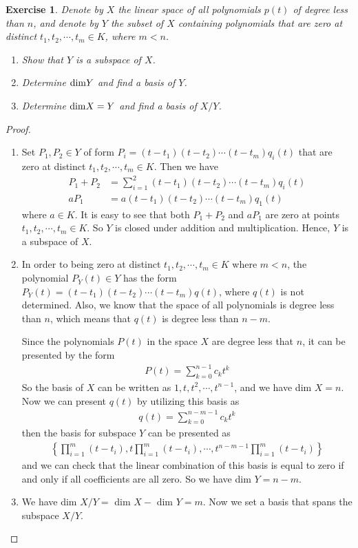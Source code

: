 \documentclass[10pt]{book}
\newtheorem{exercise}{Exercise}[section]
\theoremstyle{definition}
\numberwithin{equation}{chapter}
\begin{document}
\medskip

\begin{exercise}\label{ex_4}
Denote by $X$ the linear space of all polynomials $p(t)$ of degree less than $n$, and denote by $Y$ the subset of $X$ containing polynomials that are zero at distinct $t_1,t_2,\cdots,t_m\in K$, where $m < n$.
\begin{enumerate}[label=(\alph*)]
    \item Show that $Y$ is a subspace of $X$.
    \item Determine ${\rm dim}Y$ and find a basis of $Y$.
    \item Determine ${\rm dim}X = Y$ and find a basis of $X/Y$.
\end{enumerate}
\end{exercise}
\begin{proof}
~\begin{enumerate}[label=(\alph*)]
    \item Set $P_1, P_2 \in Y$ of form $P_i = (t-t_1)(t-t_2) \cdots (t-t_m)q_i(t)$ that are zero at distinct $t_1, t_2, \cdots, t_m\in K$. Then we have 
    \begin{align*}
        P_1 + P_2 &= \sum^2_{i=1}(t-t_1)(t-t_2) \cdots (t-t_m)q_i(t) \\
        a P_1 &= a (t-t_1)(t-t_2) \cdots (t-t_m)q_1(t)
    \end{align*}
    where $a \in K$. It is easy to see that both $P_1 + P_2$ and $a P_1$ are zero at points $t_1, t_2, \cdots, t_m\in K$. So $Y$ is closed under addition and multiplication. Hence, $Y$ is a subspace of $X$.
    \item In order to being zero at distinct $t_1, t_2, \cdots, t_m\in K$ where $m < n$, the polynomial $P_Y(t) \in Y$ has the form $P_Y(t) = (t-t_1)(t-t_2) \cdots (t-t_m)q(t)$, where $q(t)$ is not determined. Also, we know that the space of all polynomials is degree less than $n$, which means that $q(t)$ is degree less than $n-m$.
    
    Since the polynomials $P(t)$ in the space $X$ are degree less that $n$, it can be presented by the form
    \begin{align*}
        P(t) = \sum^{n-1}_{k=0} c_k t^k
    \end{align*}
    So the basis of $X$ can be written as ${1, t, t^2,\cdots, t^{n-1}}$, and we have dim $X = n$. Now we can present $q(t)$ by utilizing this basis as 
    \begin{align*}
        q(t) = \sum^{n-m-1}_{k=0} c_k t^k
    \end{align*}
    then the basis for subspace $Y$ can be presented as
    \begin{align*}
        \left\{ \prod^m_{i=1}(t-t_i), t\prod^m_{i=1}(t-t_i),\cdots, t^{n-m-1}\prod^m_{i=1}(t-t_i) \right\}
    \end{align*}
    and we can check that the linear combination of this basis is equal to zero if and only if all coefficients are all zero. So we have dim $Y = n-m$.
    \item We have dim $X/Y =$ dim $X -$ dim $Y = m$. Now we set a basis that spans the subspace $X/Y$.
    

\end{enumerate}
\end{proof}
\end{document}

